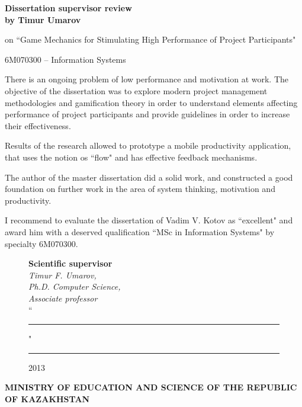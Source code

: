 \begin{titlepage}
\begin{centering}
        {\bf
        Dissertation supervisor review\\
        by Timur Umarov
        }
        
        on ``Game Mechanics for Stimulating High Performance of Project Participants"

        \vspace{14pt}
        \small 6M070300 -- Information Systems

    \end{centering}
    
    
    There is an ongoing problem of low performance and motivation at work. The objective of the dissertation was to explore modern project management methodologies and gamification theory in order to understand elements affecting performance of project participants and provide guidelines in order to increase their effectiveness.
    
    Results of the research allowed to prototype a mobile productivity application, that uses the notion os ``flow" and has effective feedback mechanisms.
    
    The author of the master dissertation did a solid work, and constructed a good foundation on further work in the area of system thinking, motivation and productivity.
    
    I recommend to evaluate the dissertation of Vadim V. Kotov as ``excellent" and award him with a deserved qualification ``MSc in Information Systems" by specialty 6M070300.
    

         \begin{figure}[ht]
            \begin{minipage}[t]{0.6\linewidth}
                {\bf Scientific supervisor}\\

                {\em Timur F. Umarov,\\
                Ph.D. Computer Science,\\
                Associate professor}\\
                
                ``\rule{2em}{0.4pt}" \rule{8em}{0.4pt} 2013\\
         \end{minipage}
    \end{figure}
        
        \pagebreak
        

    \begin{centering}
        {\bf{\MakeUppercase{Ministry of education and science of the republic of Kazakhstan}}

}
\end{centering}
\end{titlepage}

